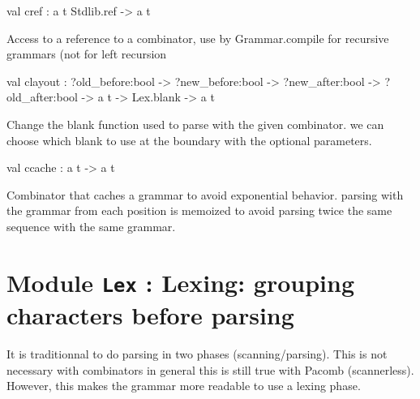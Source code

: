 \documentclass[11pt]{article}
\begin{document}
\label{val:Combinator.cref}\begin{ocamldoccode}
val cref : {\textquotesingle}a t Stdlib.ref -> {\textquotesingle}a t
\end{ocamldoccode}
\begin{ocamldocdescription}
Access to a reference to a combinator, use by Grammar.compile
    for recursive grammars (not for left recursion


\end{ocamldocdescription}




\label{val:Combinator.clayout}\begin{ocamldoccode}
val clayout :
  ?old_before:bool ->
  ?new_before:bool ->
  ?new_after:bool ->
  ?old_after:bool -> {\textquotesingle}a t -> Lex.blank -> {\textquotesingle}a t
\end{ocamldoccode}
\begin{ocamldocdescription}
Change the blank function used to parse with the given combinator.
    we can choose which blank to use at the boundary with the optional
    parameters.


\end{ocamldocdescription}




\label{val:Combinator.ccache}\begin{ocamldoccode}
val ccache : {\textquotesingle}a t -> {\textquotesingle}a t
\end{ocamldoccode}
\begin{ocamldocdescription}
Combinator that caches a grammar to avoid exponential behavior.
    parsing with the grammar from each position is memoized to avoid
    parsing twice the same sequence with the same grammar.


\end{ocamldocdescription}


\section{Module {\tt{Lex}} : Lexing: grouping characters before parsing}
\label{module:Lex}



    It is traditionnal to do parsing in two phases (scanning/parsing).  This
    is not necessary with combinators in general this is still true with
    Pacomb (scannerless). However, this makes the grammar more readable to
    use a lexing phase.
\end{document}
